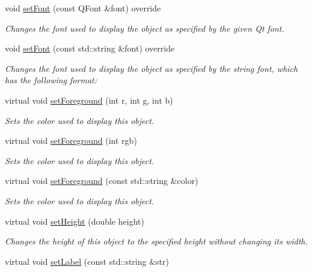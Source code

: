 \begin{DoxyCompactItemize}
void \mbox{\hyperlink{classsgl_1_1GText_ad1d75b3840a41ba7d1e8a921696dc684}{set\+Font}} (const Q\+Font \&font) override
\begin{DoxyCompactList}\small\item\em Changes the font used to display the object as specified by the given Qt font. \end{DoxyCompactList}\item 
void \mbox{\hyperlink{classsgl_1_1GText_a51367c9fd2709973b1f7238734f93891}{set\+Font}} (const std\+::string \&font) override
\begin{DoxyCompactList}\small\item\em Changes the font used to display the object as specified by the string {\ttfamily font}, which has the following format\+: \end{DoxyCompactList}\item 
virtual void \mbox{\hyperlink{classsgl_1_1GObject_ad18e8fab1e02a4e9b75c6730212558eb}{set\+Foreground}} (int r, int g, int b)
\begin{DoxyCompactList}\small\item\em Sets the color used to display this object. \end{DoxyCompactList}\item 
virtual void \mbox{\hyperlink{classsgl_1_1GObject_a9eb856b5ff83a19df3831a31f15f4563}{set\+Foreground}} (int rgb)
\begin{DoxyCompactList}\small\item\em Sets the color used to display this object. \end{DoxyCompactList}\item 
virtual void \mbox{\hyperlink{classsgl_1_1GObject_af59209aeadea6dfc6d97a2d8531f50e1}{set\+Foreground}} (const std\+::string \&color)
\begin{DoxyCompactList}\small\item\em Sets the color used to display this object. \end{DoxyCompactList}\item 
virtual void \mbox{\hyperlink{classsgl_1_1GObject_a9e280bfc4544dfaf8e4376c4e1a74357}{set\+Height}} (double height)
\begin{DoxyCompactList}\small\item\em Changes the height of this object to the specified height without changing its width. \end{DoxyCompactList}\item 
virtual void \mbox{\hyperlink{classsgl_1_1GText_a889d82f199797fea605ee8230dcd4f6f}{set\+Label}} (const std\+::string \&str)

\end{DoxyCompactItemize}
